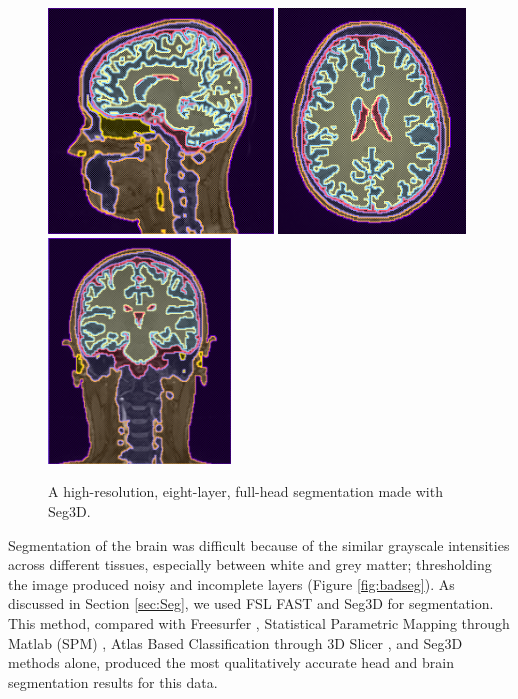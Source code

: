 \begin{figure}[H]
\begin{center}
\includegraphics[height=2.35in]{Figures/seg_1}
\includegraphics[height=2.35in]{Figures/seg_2}
\includegraphics[height=2.35in]{Figures/seg_3}
\caption{A high-resolution, eight-layer, full-head segmentation made with Seg3D.}
\label{fig:fullseg}
\end{center}
\end{figure}

Segmentation of the brain was difficult because of the similar grayscale intensities across different tissues, especially between white and grey matter; thresholding the image produced noisy and incomplete layers (Figure \ref{fig:badseg}). As discussed in Section \ref{sec:Seg}, we used FSL FAST and Seg3D for segmentation. This method, compared with Freesurfer \cite{ref:freesurf}, Statistical Parametric Mapping through Matlab (SPM) \cite{ref:spm}, Atlas Based Classification through 3D Slicer \cite{ref:abc}, and Seg3D methods alone, produced the most qualitatively accurate head and brain segmentation results for this data.

